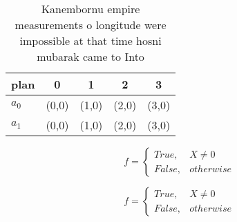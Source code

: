 \documentclass[a4paper]{article}
\begin{document}
\begin{table}
\begin{adjustbox}{width=0.5\columnwidth}
\begin{tabular}{|l|l|l|l|l|}
\hline
\textbf{plan} & \multicolumn{1}{c|}{\textbf{0}} & \multicolumn{1}{c|}{\textbf{1}} & \multicolumn{1}{c|}{\textbf{2}} & \multicolumn{1}{c|}{\textbf{3}} \\ \hline
\textbf{$a_0$}  & (0,0) & (1,0) & (2,0) & (3,0) \\ \hline
\textbf{$a_1$}  & (0,0) & (1,0) & (2,0) & (3,0) \\ \hline
\end{tabular}
\end{adjustbox}
\caption{Kanembornu empire measurements o longitude were impossible at that time hosni mubarak came to Into 
}
\end{table}

\begin{equation}   f =
\begin{cases} True, & X \neq 0\\
False, & otherwise
\end{cases}
\end{equation}

\begin{equation}   f =
\begin{cases} True, & X \neq 0\\
False, & otherwise
\end{cases}
\end{equation}
\end{document}
